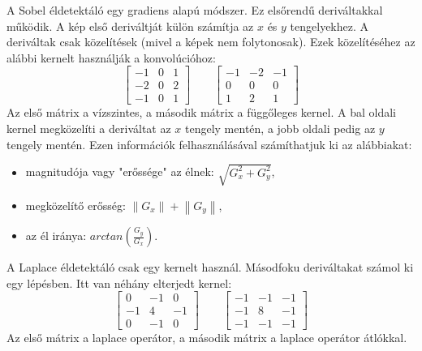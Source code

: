 


A Sobel éldetektáló egy gradiens alapú módszer. Ez elsőrendű deriváltakkal működik. A kép első deriváltját külön számítja az $x$ és $y$ tengelyekhez. A deriváltak csak közelítések (mivel a képek nem folytonosak). Ezek közelítéséhez az alábbi kernelt használják a konvolúcióhoz:
$$\begin{bmatrix}
-1&0  &1 \\ 
-2&0  &2 \\ 
-1&0  &1 
\end{bmatrix} 
\qquad
\begin{bmatrix}
-1&-2  &-1 \\ 
0&0  &0 \\ 
1&2  &1 
\end{bmatrix}
$$
Az első mátrix a vízszintes, a második mátrix a függőleges kernel. A bal oldali kernel megközelíti a deriváltat az $x$ tengely mentén, a jobb oldali pedig az $y$ tengely mentén. Ezen információk felhasználásával számíthatjuk ki az alábbiakat:
\begin{itemize}
\item magnitudója vagy "erőssége" az élnek: $\sqrt{G_{x}^{2}+G_{y}^{2}}$,
\item megközelítő erősség: $ \left\| G_x \right \| + \left\| G_y \right \|$,
\item az él iránya: $arctan(\frac{G_y}{G_x})$.
\end{itemize}



A Laplace éldetektáló csak egy kernelt használ. Másodfoku deriváltakat számol ki egy lépésben. Itt van néhány elterjedt kernel:
$$\begin{bmatrix}
 0 & -1  & 0 \\ 
-1 &  4  &-1 \\ 
 0 & -1  & 0 
\end{bmatrix} 
\qquad
\begin{bmatrix}
-1 & -1 & -1 \\ 
-1 &  8 & -1 \\ 
-1 & -1 & -1 
\end{bmatrix}
$$
Az első mátrix a laplace operátor, a második mátrix a laplace operátor átlókkal.

